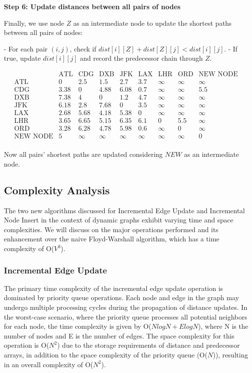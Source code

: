 \documentclass[conference]{IEEEtran}
\begin{document}
\textbf{Step 6: Update distances between all pairs of nodes}

Finally, we use node \( Z \) as an intermediate node to update the shortest paths between all pairs of nodes:

- For each pair \( (i, j) \), check if \( dist[i][Z] + dist[Z][j] < dist[i][j] \).
- If true, update \( dist[i][j] \) and record the predecessor chain through \( Z \).

\[
\begin{array}{c|cccccccc}
     & \text{ATL} & \text{CDG} & \text{DXB} & \text{JFK} & \text{LAX} & \text{LHR} & \text{ORD} & \text{NEW NODE} \\
\hline
\text{ATL} & 0 & 2.5 & 1.5 & 2.7 & 3.7 & \infty & \infty  & \infty\\
\text{CDG} & 3.38 & 0 & 4.88 & 6.08 & 0.7 & \infty & \infty & 5.5 \\
\text{DXB} & 7.38 & 4 & 0 & 1.2 & 4.7 & \infty  & \infty & \infty \\
\text{JFK} & 6.18 & 2.8 & 7.68 & 0 & 3.5 & \infty & \infty & \infty \\
\text{LAX} & 2.68 & 5.68 & 4.18 & 5.38 & 0 & \infty & \infty & \infty \\
\text{LHR} & 3.65 & 6.65 & 5.15 & 6.35 & 6.1 & 0 & 5.5 & \infty \\
\text{ORD} & 3.28 & 6.28 & 4.78 & 5.98 & 0.6 & \infty & 0 & \infty\\
\text{NEW NODE} & 5 & \infty & \infty & \infty & \infty & \infty & \infty & 0 \\
\end{array}
\]

Now all pairs' shortest paths are updated considering \( NEW \) as an intermediate node.


\subsection{Complexity Analysis}

The two new algorithms discussed for Incremental Edge Update and Incremental Node Insert in the context of dynamic graphs exhibit varying time and space complexities. We will discuss on the major operations performed and its enhancement over the naive Floyd-Warshall algorithm, which has a time complexity of O($V^3$).

\subsubsection{Incremental Edge Update}
The primary time complexity of the incremental edge update operation is dominated by priority queue operations. Each node and edge in the graph may undergo multiple processing cycles during the propagation of distance updates. In the worst-case scenario, where the priority queue processes all potential neighbors for each node, the time complexity is given by O($N log N + E log N$), where N is the number of nodes and E is the number of edges. The space complexity for this operation is O($N^2$) due to the storage requirements of distance and predecessor arrays, in addition to the space complexity of the priority queue (O($N$)), resulting in an overall complexity of O($N^2$).
\end{document}
